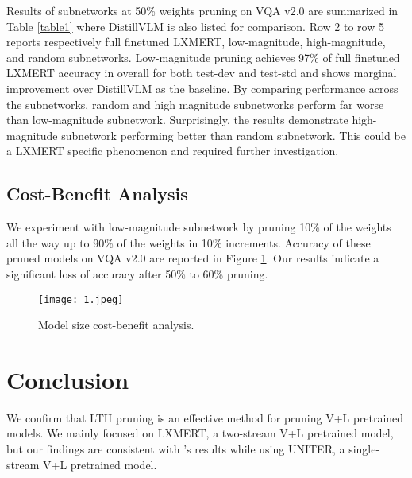 \documentclass[11pt,a4paper]{article}
\begin{document}
Results of subnetworks at 50\% weights pruning on VQA v2.0 are summarized in Table \ref{table1} where DistillVLM \cite{Fang_2021_ICCV} is also listed for comparison. Row 2 to row 5 reports respectively full finetuned LXMERT, low-magnitude, high-magnitude, and random subnetworks. Low-magnitude pruning achieves 97\% of full finetuned LXMERT accuracy in overall for both test-dev and test-std and shows marginal improvement over DistillVLM as the baseline. By comparing performance across the subnetworks, random and high magnitude subnetworks perform far worse than low-magnitude subnetwork. Surprisingly, the results demonstrate high-magnitude subnetwork performing better than random subnetwork. This could be a LXMERT specific phenomenon and required further investigation.


\subsection{Cost-Benefit Analysis}
We experiment with low-magnitude subnetwork by pruning 10\% of the weights all the way up to 90\% of the weights in 10\% increments. Accuracy of these pruned models on VQA v2.0 are reported in Figure \ref{costbenefit}. Our results indicate a significant loss of accuracy after 50\% to 60\% pruning. 
\begin{figure}[h!]
	\centering\texttt{[image: 1.jpeg]}
	\caption{Model size cost-benefit analysis.}
	\label{costbenefit}
    \vspace{-2mm}    	
\end{figure}

\section{Conclusion}
We confirm that LTH pruning is an effective method for pruning V+L pretrained models. We mainly focused on LXMERT, a two-stream V+L pretrained model, but our findings are consistent with \citet{gan2021playing}'s results while using UNITER, a single-stream V+L pretrained model.  



\end{document}
